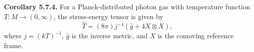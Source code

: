 \textbf{Corollary 5.7.4.} For a Planck-distributed photon gas with temperature function $T: M \to (0, \infty)$, the stress-energy tensor is given by
$$\hat{T} = (8\pi) j^{-4}(\hat{g} + 4 X \otimes X),$$
where $j = (kT)^{-1}$, $\hat{g}$ is the inverse metric, and $X$ is the comoving reference frame.
